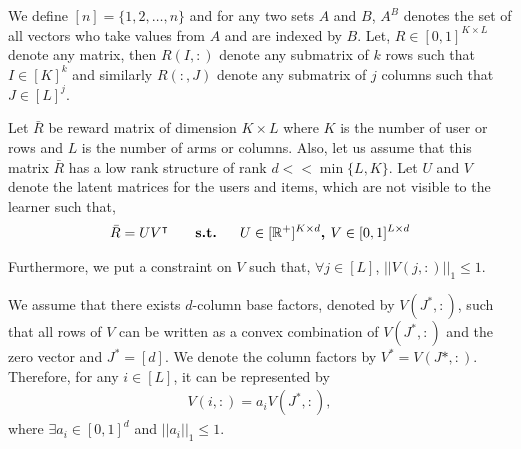 	
	We define $[n] = \lbrace 1,2,\ldots, n\rbrace$ and for any two sets $A$ and $B$, $A^B$ denotes the set of all vectors who take values from $A$ and are indexed by $B$. Let, $R\in [0,1]^{K\times L}$ denote any matrix, then $R(I,:)$ denote any submatrix of $k$ rows such that $I\in[K]^k$ and similarly $R(:,J)$ denote any submatrix of $j$ columns such that $J\in[L]^{j}$.
	
	Let $\bar{R}$ be reward matrix of  dimension $K\times L$ where $K$ is the number of user or rows and $L$ is the number of arms or columns. Also, let us assume that this matrix  $\bar{R}$ has a low rank structure of rank $d << \min\lbrace L,K\rbrace$. Let $U$ and $V$ denote the latent matrices for the users and items, which are not visible to the learner such that,
\begin{align*}
	\bar{R} = UV^{\intercal} \textbf{ \hspace*{4mm}   s.t.   \hspace*{4mm}} U\in [ \mathbb{R}^+ ]^{K\times d} \textbf{, } V\in  [0,1]^{L\times d} 
\end{align*}	  
	
	Furthermore, we put a constraint on $V$ such that, $\forall j\in [L]$, $ ||V(j,:)||_1 \leq 1$. 
	
	
%	


\begin{assumption}
\label{assm:1}
We assume that there exists $d$-column base factors, denoted by $V(J^*,:)$, such that all rows of $V$ can be written as a convex combination of $V(J^*,:)$ and the zero vector and $J^* = [d]$. We denote the column factors by $V^* = V(J*,:)$. Therefore, for any $i\in [L]$, it can be represented by
\begin{align*}
V(i,:) = a_i V(J^*,:) , 
\end{align*}
where $\exists a_i\in [0,1]^{d}$ and $ ||a_i||_1 \leq 1$.
\end{assumption}

